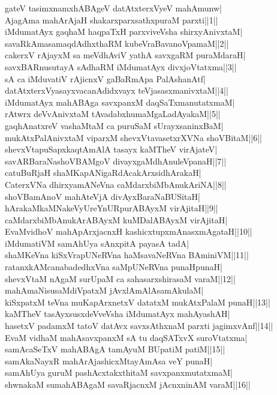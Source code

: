 \documentclass{article}
\begin{document}
gateV tasimxnamxhABAgeV datAtxterxVyeV mahAmunw|\\
AjagAma mahArAjaH shakarxparxsathxpuraM parxti||1||\\
iMdumatAyx gaqhaM haqpaTxH parxviveVsha shirxyAnivxtaM|\\
savaRkAmasamaqdAdhxthaRM kubeVraBavanoVpamaM||2||\\
cakerxV rAjayxM sa meVdhAviV yathA savxgaRM puraMdaraH|\\
savxBARnusutayA sAdhaRM iMdumatAyx divxjoVtatxma||3||\\
sA ca iMduvatiV rAjicnxV gaBaRmApa PalAshanAtf|\\
datAtxterxVyasayxvacanAdidxvayx teVjasasxmanivxtaM||4||\\
iMdumatAyx mahABAga savxpanxM daqSaTxmanutatxmaM|\\
rAtwrx deVvAnivxtaM tAvadabxhumaMgaLadAyakaM||5||\\
gaqhAnatxreV vashaMtaM ca puruSaM sUrayxsaninxBaM|\\
mukAtxPalAnivxtaM viparxM shevxVtavasetxrXVNa shoVBitaM||6||\\
shevxVtapuSapxkaqtAmAlA tasayx kaMTheV virAjateV|\\
savARBaraNashoVBAMgoV divayxgaMdhAnuleVpanaH||7||\\
catuBuRjaH shaMKapANigaRdAcakArxsidhArakaH|\\
CaterxVNa dhirxyamANeVna caMdarxbiMbAnukAriNA||8||\\
shoVBamAnoV mahAteVjA divAyxBaraNaBUSitaH|\\
hArakaMkaMNakeVyUreYnURpurABAyxM virAjitaH||9||\\
caMdarxbiMbAnukArABAyxM kuMDalABAyxM virAjitaH|\\
EvaMvidhoV mahApArxjacnxH kashicxtupxmAnasxmAgataH||10||\\
iMdumatiVM samAhUya sAnxpitA payasA tadA|\\
shaMKeVna kiSxVrapUNeRVna haMsavaNeRVna BAminiVM||11||\\
ratanxkAMcanabadedhxVna saMpUNeRVna punaHpunaH|\\
shevxVtaM nAgaM surUpaM ca sahasarxshirasaM varaM||12||\\
mahAmaNisusaMdiVpatxM jAvxlAmAlAsamAkulaM|\\
kiSxpatxM teVna muKapArxnetxV datatxM mukAtxPalaM punaH||13||\\
kaMTheV tasAyxsusxdeVveVsha iMdumatAyx mahAyashAH|\\
hasetxV padamxM tatoV datAvx savxsAthxnaM parxti jagimxvAnf||14||\\
EvaM vidhaM mahAsavxpanxM sA tu daqSATxvX suroVtatxma|\\
samAcaSeTxV mahABAgA tamAyuM BUpatiM patiM||15||\\
samAkaNayxR mahArAjashicxMtayAmAsa veY punaH|\\
samAhUya guruM pashAcxtakxthitaM savxpanxmutatxmaM|\\
shwnakaM sumahABAgaM savaRjacnxM jAcnxninAM varaM||16||\\
\end{document}
